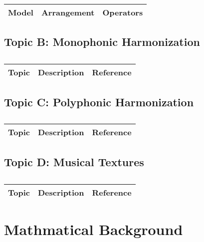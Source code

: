 \centering	
\begin{table}[H]\tiny
	\caption{}	
	\begin{tabular}{r|p{4cm}|l}
		\hline	
		Model & Arrangement & Operators \\
		\hline 
		\hline 
	\end{tabular}
\end{table}

\subsection{Topic B: Monophonic Harmonization}

\centering	
\begin{table}[H]\tiny
	\caption{}	
	\begin{tabular}{r|p{4cm}|l}
		\hline	
		Topic & Description & Reference \\
		\hline 
		\hline 
	\end{tabular}
\end{table}

\subsection{Topic C: Polyphonic Harmonization}

\centering	
\begin{table}[H]\tiny
	\caption{}	
	\begin{tabular}{r|p{4cm}|l}
		\hline	
		Topic & Description & Reference \\
		\hline 
		\hline 
	\end{tabular}
\end{table}

\subsection{Topic D: Musical Textures}

\centering	
\begin{table}[H]\tiny
	\caption{}	
	\begin{tabular}{r|p{4cm}|l}
		\hline	
		Topic & Description & Reference \\
		\hline 
		\hline 
	\end{tabular}
\end{table}


\section{Mathmatical Background}

